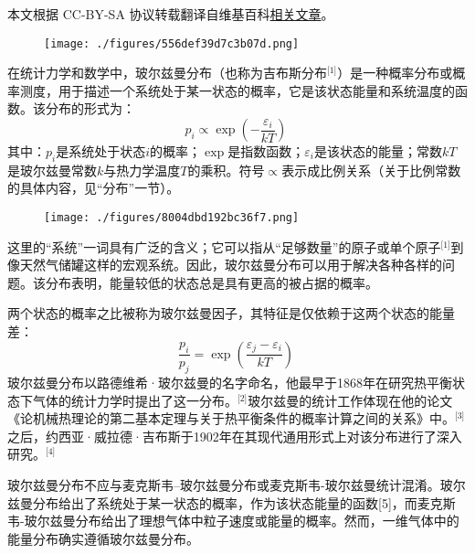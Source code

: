 
本文根据 CC-BY-SA 协议转载翻译自维基百科\href{https://en.wikipedia.org/wiki/Boltzmann_distribution}{相关文章}。

\begin{figure}[ht]
\centering
\texttt{[image: ./figures/556def39d7c3b07d.png]}
\caption{} \label{fig_BRCMLZ_1}
\end{figure}
在统计力学和数学中，玻尔兹曼分布（也称为吉布斯分布\(^\text{[1]}\)）是一种概率分布或概率测度，用于描述一个系统处于某一状态的概率，它是该状态能量和系统温度的函数。该分布的形式为：
\[
p_i \propto \exp\left(-\frac{\varepsilon_i}{kT}\right)~
\]
其中：\( p_i \)是系统处于状态\( i \)的概率；\( \exp \)是指数函数；\( \varepsilon_i \)是该状态的能量；常数\( kT \)是玻尔兹曼常数\( k \)与热力学温度\( T \)的乘积。符号\( \propto \)表示成比例关系（关于比例常数的具体内容，见“分布”一节）。
\begin{figure}[ht]
\centering
\texttt{[image: ./figures/8004dbd192bc36f7.png]}
\caption{} \label{fig_BRCMLZ_2}
\end{figure}
这里的“系统”一词具有广泛的含义；它可以指从“足够数量”的原子或单个原子\(^\text{[1]}\)到像天然气储罐这样的宏观系统。因此，玻尔兹曼分布可以用于解决各种各样的问题。该分布表明，能量较低的状态总是具有更高的被占据的概率。

两个状态的概率之比被称为玻尔兹曼因子，其特征是仅依赖于这两个状态的能量差：
\[
\frac{p_i}{p_j} = \exp\left(\frac{\varepsilon_j - \varepsilon_i}{kT}\right)~
\]
玻尔兹曼分布以路德维希·玻尔兹曼的名字命名，他最早于1868年在研究热平衡状态下气体的统计力学时提出了这一分布。\(^\text{[2]}\)玻尔兹曼的统计工作体现在他的论文《论机械热理论的第二基本定理与关于热平衡条件的概率计算之间的关系》中。\(^\text{[3]}\)之后，约西亚·威拉德·吉布斯于1902年在其现代通用形式上对该分布进行了深入研究。\(^\text{[4]}\)

玻尔兹曼分布不应与麦克斯韦–玻尔兹曼分布或麦克斯韦-玻尔兹曼统计混淆。玻尔兹曼分布给出了系统处于某一状态的概率，作为该状态能量的函数[5]，而麦克斯韦-玻尔兹曼分布给出了理想气体中粒子速度或能量的概率。然而，一维气体中的能量分布确实遵循玻尔兹曼分布。

